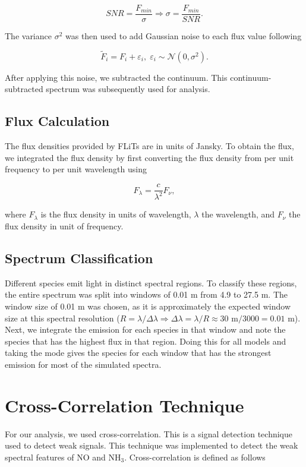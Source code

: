 \documentclass[oneside, single, authoryear, semicolon, 12pt]{lion-msc}
\newcommand{\4}{$_4$}
\newcommand{\3}{$_3$}
\newcommand{\2}{$_2$}
\begin{document}
\begin{equation}
    SNR = \frac{F_{min}}{\sigma}\Rightarrow\sigma=\frac{F_{min}}{SNR}.
    \label{eq: SNR}
\end{equation}

The variance $\sigma^2$ was then used to add Gaussian noise to each flux value following 

\begin{equation}
    \tilde{F}_i = F_i + \varepsilon_i,\;\varepsilon_i\sim\mathcal{N}(0, \sigma^2).
    \label{eq: noise}
\end{equation}

After applying this noise, we subtracted the continuum. This continuum-subtracted spectrum was subsequently used for analysis.

\subsection{Flux Calculation}
The flux densities provided by FLiTs are in units of Jansky. To obtain the flux, we integrated the flux density by first converting the flux density from per unit frequency to per unit wavelength using

\begin{equation}
    F_\lambda=\frac{c}{\lambda^2}F_\nu,
    \label{eq: conversion}
\end{equation}

where $F_\lambda$ is the flux density in units of wavelength, $\lambda$ the wavelength, and $F_\nu$ the flux density in unit of frequency.
\subsection{Spectrum Classification}
Different species emit light in distinct spectral regions. To classify these regions, the entire spectrum was split into windows of 0.01 \textmu m from 4.9 to 27.5 \textmu m. The window size of 0.01 \textmu m was chosen, as it is approximately the expected window size at this spectral resolution ($R=\lambda/\Delta\lambda\Rightarrow\Delta\lambda=\lambda/R\approx30 $ \textmu$\mathrm{m}/3000=0.01$ \textmu$\mathrm{m}$). Next, we integrate the emission for each species in that window and note the species that has the highest flux in that region. Doing this for all models and taking the mode gives the species for each window that has the strongest emission for most of the simulated spectra.  

\newpage
\section{Cross-Correlation Technique}
For our analysis, we used cross-correlation. This is a signal detection technique used to detect weak signals. This technique was implemented to detect the weak spectral features of NO and NH\3. Cross-correlation is defined as follows 
\end{document}
